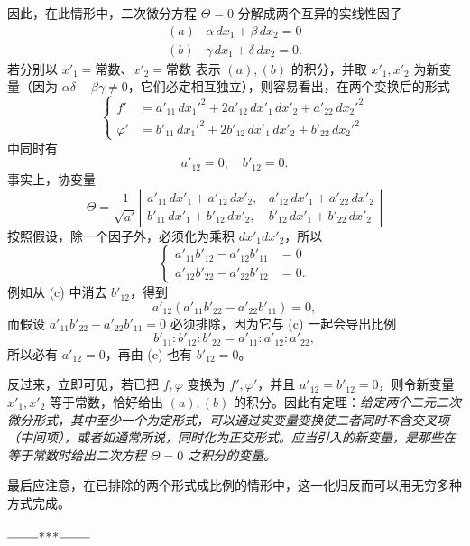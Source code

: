 因此，在此情形中，二次微分方程 $\Theta=0$ 分解成两个互异的实线性因子
\[
\begin{array}{ll}
(a)&\alpha\,dx_1+\beta\,dx_2=0\\
(b)&\gamma\,dx_1+\delta\,dx_2=0.
\end{array}
\]
若分别以 $x'_1=\mathrm{常数}$、$x'_2=\mathrm{常数}$ 表示 $(a),(b)$ 的积分，并取 $x'_1,x'_2$ 为新变量（因为 $\alpha\delta-\beta\gamma\ne0$，它们必定相互独立），则容易看出，在两个变换后的形式
\[
\left\{
\begin{aligned}
f'&=a'_{11}\,dx_1'^2+2a'_{12}\,dx'_1\,dx'_2+a'_{22}\,dx_2'^2\\
\varphi'&=b'_{11}\,dx_1'^2+2b'_{12}\,dx'_1\,dx'_2+b'_{22}\,dx_2'^2
\end{aligned}
\right.
\]
中同时有
\[
a'_{12}=0,\quad b'_{12}=0.
\]
事实上，协变量
\[
\Theta=\frac{1}{\sqrt{a'}}
\left|\begin{matrix}
a'_{11}\,dx'_1+a'_{12}\,dx'_2,&a'_{12}\,dx'_1+a'_{22}\,dx'_2\\
b'_{11}\,dx'_1+b'_{12}\,dx'_2,&b'_{12}\,dx'_1+b'_{22}\,dx'_2
\end{matrix}\right|
\]
按照假设，除一个因子外，必须化为乘积 $dx'_1dx'_2$，所以
\begin{equation}\tag{c}
\left\{
\begin{aligned}
a'_{11}b'_{12}-a'_{12}b'_{11}&=0\\
a'_{12}b'_{22}-a'_{22}b'_{12}&=0.
\end{aligned}
\right.
\end{equation}
例如从 (c) 中消去 $b'_{12}$，得到
\[
a'_{12}(a'_{11}b'_{22}-a'_{22}b'_{11})=0,
\]
而假设 $a'_{11}b'_{22}-a'_{22}b'_{11}=0$ 必须排除，因为它与 (c) 一起会导出比例
\[
b'_{11}:b'_{12}:b'_{22}=a'_{11}:a'_{12}:a'_{22},
\]
所以必有 $a'_{12}=0$，再由 (c) 也有 $b'_{12}=0$。

反过来，立即可见，若已把 $f,\varphi$ 变换为 $f',\varphi'$，并且 $a'_{12}=b'_{12}=0$，则令新变量 $x'_1,x'_2$ 等于常数，恰好给出 $(a),(b)$ 的积分。因此有定理：\emph{给定两个二元二次微分形式，其中至少一个为定形式，可以通过实变量变换使二者同时不含交叉项（中间项），或者如通常所说，同时化为正交形式。应当引入的新变量，是那些在等于常数时给出二次方程 $\Theta=0$ 之积分的变量。}

最后应注意，在已排除的两个形式成比例的情形中，这一化归反而可以用无穷多种方式完成。

\begin{center}
$\rule{2.4em}{0.4pt}\!\ast\!\ast\!\ast\!\rule{2.4em}{0.4pt}$
\end{center}




\providecommand{\chrone}[3]{\left[\begin{matrix}#1\ #2\\ #3\end{matrix}\right]}
\providecommand{\chrtwo}[3]{\left\{\begin{matrix}#1\ #2\\ #3\end{matrix}\right\}}
\providecommand{\cst}{\mathrm{cost}^{\mathrm{te}}}
